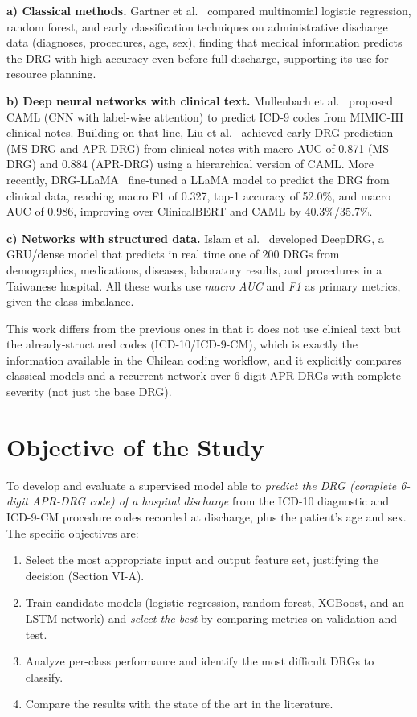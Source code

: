 \documentclass{ieeeaccess}
\begin{document}
\textbf{a) Classical methods.} Gartner et al.~\cite{b3} compared multinomial logistic regression, random forest, and early classification techniques on administrative discharge data (diagnoses, procedures, age, sex), finding that medical information predicts the DRG with high accuracy even before full discharge, supporting its use for resource planning.

\textbf{b) Deep neural networks with clinical text.} Mullenbach et al.~\cite{b4} proposed CAML (CNN with label-wise attention) to predict ICD-9 codes from MIMIC-III clinical notes. Building on that line, Liu et al.~\cite{b5} achieved early DRG prediction (MS-DRG and APR-DRG) from clinical notes with macro AUC of 0.871 (MS-DRG) and 0.884 (APR-DRG) using a hierarchical version of CAML. More recently, DRG-LLaMA~\cite{b6} fine-tuned a LLaMA model to predict the DRG from clinical data, reaching macro F1 of 0.327, top-1 accuracy of 52.0\%, and macro AUC of 0.986, improving over ClinicalBERT and CAML by 40.3\%/35.7\%.

\textbf{c) Networks with structured data.} Islam et al.~\cite{b7} developed DeepDRG, a GRU/dense model that predicts in real time one of 200 DRGs from demographics, medications, diseases, laboratory results, and procedures in a Taiwanese hospital. All these works use \emph{macro AUC} and \emph{F1} as primary metrics, given the class imbalance.

This work differs from the previous ones in that it does not use clinical text but the already-structured codes (ICD-10/ICD-9-CM), which is exactly the information available in the Chilean coding workflow, and it explicitly compares classical models and a recurrent network over 6-digit APR-DRGs with complete severity (not just the base DRG).

\section{Objective of the Study}
\label{sec:objective}
To develop and evaluate a supervised model able to \emph{predict the DRG (complete 6-digit APR-DRG code) of a hospital discharge} from the ICD-10 diagnostic and ICD-9-CM procedure codes recorded at discharge, plus the patient's age and sex. The specific objectives are:
\begin{enumerate}
  \item Select the most appropriate input and output feature set, justifying the decision (Section VI-A).
  \item Train candidate models (logistic regression, random forest, XGBoost, and an LSTM network) and \emph{select the best} by comparing metrics on validation and test.
  \item Analyze per-class performance and identify the most difficult DRGs to classify.
  \item Compare the results with the state of the art in the literature.
\end{enumerate}
\end{document}
